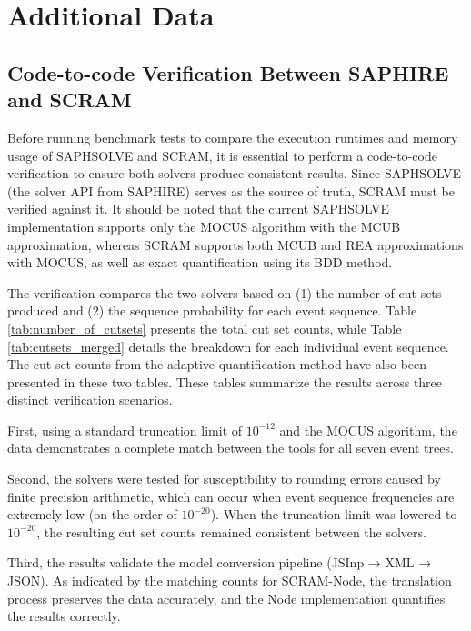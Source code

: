 \chapter{Additional Data}
\section{Code-to-code Verification Between SAPHIRE and SCRAM}
\label{sec:appendix_a}

Before running benchmark tests to compare the execution runtimes and memory usage of SAPHSOLVE and SCRAM, it is essential to perform a code-to-code verification to ensure both solvers produce consistent results. Since SAPHSOLVE (the solver API from SAPHIRE) serves as the source of truth, SCRAM must be verified against it. It should be noted that the current SAPHSOLVE implementation supports only the MOCUS algorithm with the MCUB approximation, whereas SCRAM supports both MCUB and REA approximations with MOCUS, as well as exact quantification using its BDD method.



The verification compares the two solvers based on (1) the number of cut sets produced and (2) the sequence probability for each event sequence. Table \ref{tab:number_of_cutsets} presents the total cut set counts, while Table \ref{tab:cutsets_merged} details the breakdown for each individual event sequence. The cut set counts from the adaptive quantification method have also been presented in these two tables. These tables summarize the results across three distinct verification scenarios.

First, using a standard truncation limit of $10^{-12}$ and the MOCUS algorithm, the data demonstrates a complete match between the tools for all seven event trees.

Second, the solvers were tested for susceptibility to rounding errors caused by finite precision arithmetic, which can occur when event sequence frequencies are extremely low (on the order of $10^{-20}$). When the truncation limit was lowered to $10^{-20}$, the resulting cut set counts remained consistent between the solvers.

Third, the results validate the model conversion pipeline (JSInp → XML → JSON). As indicated by the matching counts for SCRAM-Node, the translation process preserves the data accurately, and the Node implementation quantifies the results correctly.



